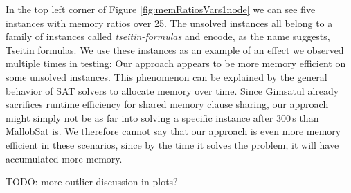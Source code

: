 \documentclass[12pt,a4paper,twoside]{scrartcl}
\numberwithin{equation}{section}
\begin{document}
In the top left corner of Figure \ref{fig:memRatiosVars1node} we can see five instances with memory ratios over 25. The unsolved instances all belong to a family of instances called \textit{tseitin-formulas} and encode, as the name suggests, Tseitin formulas. We use these instances as an example of an effect we observed multiple times in testing: Our approach appears to be more memory efficient on some unsolved instances. This phenomenon can be explained by the general behavior of SAT solvers to allocate memory over time. Since Gimsatul already sacrifices runtime efficiency for shared memory clause sharing, our approach might simply not be as far into solving a specific instance after $300\,$s than MallobSat is. We therefore cannot say that our approach is even more memory efficient in these scenarios, since by the time it solves the problem, it will have accumulated more memory.

TODO: more outlier discussion in plots?
\end{document}

